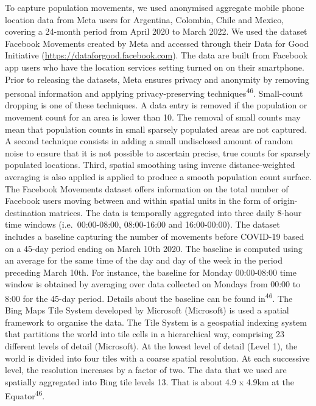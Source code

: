 \documentclass[
  11pt,
]{article}
\begin{document}
To capture population movements, we used anonymised aggregate mobile
phone location data from Meta users for Argentina, Colombia, Chile and
Mexico, covering a 24-month period from April 2020 to March 2022. We
used the dataset Facebook Movements created by Meta and accessed through
their Data for Good Initiative (\url{https://dataforgood.facebook.com}).
The data are built from Facebook app users who have the location
services setting turned on on their smartphone. Prior to releasing the
datasets, Meta ensures privacy and anonymity by removing personal
information and applying privacy-preserving
techniques\textsuperscript{46}. Small-count dropping is one of these
techniques. A data entry is removed if the population or movement count
for an area is lower than 10. The removal of small counts may mean that
population counts in small sparsely populated areas are not captured. A
second technique consists in adding a small undisclosed amount of random
noise to ensure that it is not possible to ascertain precise, true
counts for sparsely populated locations. Third, spatial smoothing using
inverse distance-weighted averaging is also applied is applied to
produce a smooth population count surface. The Facebook Movements
dataset offers information on the total number of Facebook users moving
between and within spatial units in the form of origin-destination
matrices. The data is temporally aggregated into three daily 8-hour time
windows (i.e.~00:00-08:00, 08:00-16:00 and 16:00-00:00). The dataset
includes a baseline capturing the number of movements before COVID-19
based on a 45-day period ending on March 10th 2020. The baseline is
computed using an average for the same time of the day and day of the
week in the period preceding March 10th. For instance, the baseline for
Monday 00:00-08:00 time window is obtained by averaging over data
collected on Mondays from 00:00 to 8:00 for the 45-day period. Details
about the baseline can be found in\textsuperscript{46}. The Bing Maps
Tile System developed by Microsoft (Microsoft) is used a spatial
framework to organise the data. The Tile System is a geospatial indexing
system that partitions the world into tile cells in a hierarchical way,
comprising 23 different levels of detail (Microsoft). At the lowest
level of detail (Level 1), the world is divided into four tiles with a
coarse spatial resolution. At each successive level, the resolution
increases by a factor of two. The data that we used are spatially
aggregated into Bing tile levels 13. That is about 4.9 x 4.9km at the
Equator\textsuperscript{46}.
\end{document}
